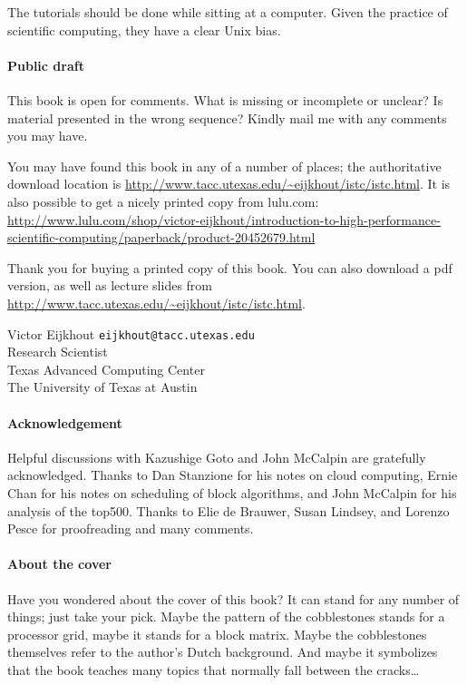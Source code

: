 The tutorials
should be done while sitting at a computer. Given the practice of
scientific computing, they have a clear Unix bias.

\begin{notlulu}
\paragraph*{\bf Public draft}

This book is 
open for comments.
What is missing or incomplete or unclear? Is material
presented in the wrong sequence? Kindly mail me with any comments you
may have.
\end{notlulu}

\begin{download}
You may have found this book in any of a number of places; the
authoritative download location is 
\url{http://www.tacc.utexas.edu/~eijkhout/istc/istc.html}.
It is also possible to get a nicely printed copy from lulu.com:\\
\url{http://www.lulu.com/shop/victor-eijkhout/introduction-to-high-performance-scientific-computing/paperback/product-20452679.html}
\end{download}
\begin{lulu}
Thank you for buying a printed copy of this book. You can also download a pdf 
version, as well as lecture slides from
\url{http://www.tacc.utexas.edu/~eijkhout/istc/istc.html}.
\end{lulu}

\bigskip
\noindent
Victor Eijkhout {\tt eijkhout@tacc.utexas.edu}\\
Research Scientist\\
Texas Advanced Computing Center\\
The University of Texas at Austin

\paragraph*{\bf Acknowledgement}

Helpful discussions with Kazushige Goto and John McCalpin are gratefully
acknowledged. Thanks to Dan Stanzione for his notes on cloud computing,
Ernie Chan for his notes on scheduling of block algorithms, and John
McCalpin for his analysis of the top500.
Thanks to Elie de Brauwer, Susan Lindsey, and Lorenzo Pesce
for proofreading and many comments.

\begin{lulu}
\paragraph*{\bf About the cover}

Have you wondered about the cover of this book? It can stand for any number of things; just take your pick. Maybe the pattern of the cobblestones stands for a processor grid, maybe it stands for a block matrix. Maybe the cobblestones themselves refer to the author's Dutch background. And maybe it symbolizes that the book teaches many topics that normally fall between the cracks\ldots
\end{lulu}

